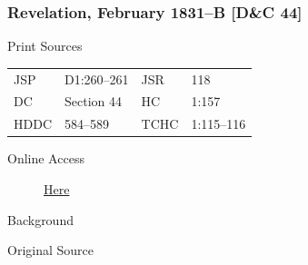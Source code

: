 		\subsubsection{Revelation, February 1831--B [D\&C 44]}
			\label{EMS-1831-JS-FEB-1831-B}
		
			\begin{description}
				\item[Print Sources]
			\end{description}

				\begin{tabular}{p{0.5in}p{1in}p{0.5in}p{1in}}
				JSP	 	& D1:260--261	& JSR 		& 118 \\
				DC	 	& Section 44 	& HC 		& 1:157 \\
				HDDC 	& 584--589		& TCHC 		& 1:115--116 \\
				\end{tabular}
			
			\begin{description}
				\item[Online Access] \href{https://www.josephsmithpapers.org/paper-summary/revelation-february-1831-b-dc-44/1}{Here}
			\end{description}
			
			\begin{description}
				\item[Background]
			\end{description}
			
			
			\begin{description}
				\item[Original Source]
			\end{description}
			
			
